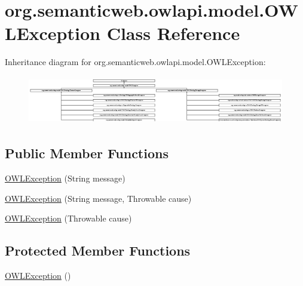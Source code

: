 \hypertarget{classorg_1_1semanticweb_1_1owlapi_1_1model_1_1_o_w_l_exception}{\section{org.\-semanticweb.\-owlapi.\-model.\-O\-W\-L\-Exception Class Reference}
\label{classorg_1_1semanticweb_1_1owlapi_1_1model_1_1_o_w_l_exception}
}
Inheritance diagram for org.\-semanticweb.\-owlapi.\-model.\-O\-W\-L\-Exception\-:\begin{figure}[H]
\begin{center}
\leavevmode
\includegraphics[height=2.131980cm]{classorg_1_1semanticweb_1_1owlapi_1_1model_1_1_o_w_l_exception}
\end{center}
\end{figure}
\subsection*{Public Member Functions}
\begin{DoxyCompactItemize}
\item 
\hyperlink{classorg_1_1semanticweb_1_1owlapi_1_1model_1_1_o_w_l_exception_a5f50fbaf87ea290026dd66fd77406e63}{O\-W\-L\-Exception} (String message)
\item 
\hyperlink{classorg_1_1semanticweb_1_1owlapi_1_1model_1_1_o_w_l_exception_ab845fd7449eccf1e4c1ee696b2252876}{O\-W\-L\-Exception} (String message, Throwable cause)
\item 
\hyperlink{classorg_1_1semanticweb_1_1owlapi_1_1model_1_1_o_w_l_exception_ac9cdbc19bcce4d4f29fc5afda8091fd0}{O\-W\-L\-Exception} (Throwable cause)
\end{DoxyCompactItemize}
\subsection*{Protected Member Functions}
\begin{DoxyCompactItemize}
\item 
\hyperlink{classorg_1_1semanticweb_1_1owlapi_1_1model_1_1_o_w_l_exception_ab52bc1465e7dafaa8f907e7c436ceced}{O\-W\-L\-Exception} ()
\end{DoxyCompactItemize}
